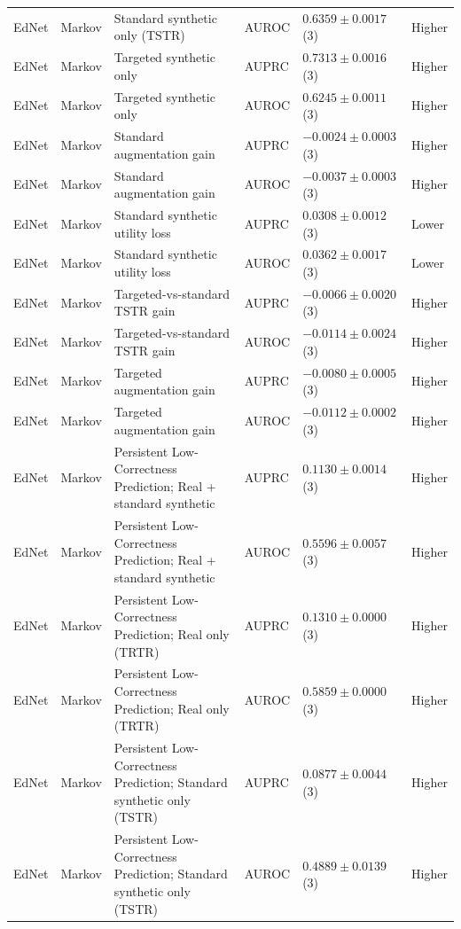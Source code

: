 \begin{longtable}{@{}p{2.25cm}p{2.05cm}p{4.7cm}p{5.0cm}p{2.6cm}p{1.25cm}@{}}
EdNet & Markov & Standard synthetic only (TSTR) & AUROC & $0.6359 \mathbin{\pm} 0.0017$ (3) & Higher \\
EdNet & Markov & Targeted synthetic only & AUPRC & $0.7313 \mathbin{\pm} 0.0016$ (3) & Higher \\
EdNet & Markov & Targeted synthetic only & AUROC & $0.6245 \mathbin{\pm} 0.0011$ (3) & Higher \\
EdNet & Markov & Standard augmentation gain & AUPRC & $-0.0024 \mathbin{\pm} 0.0003$ (3) & Higher \\
EdNet & Markov & Standard augmentation gain & AUROC & $-0.0037 \mathbin{\pm} 0.0003$ (3) & Higher \\
EdNet & Markov & Standard synthetic utility loss & AUPRC & $0.0308 \mathbin{\pm} 0.0012$ (3) & Lower \\
EdNet & Markov & Standard synthetic utility loss & AUROC & $0.0362 \mathbin{\pm} 0.0017$ (3) & Lower \\
EdNet & Markov & Targeted-vs-standard TSTR gain & AUPRC & $-0.0066 \mathbin{\pm} 0.0020$ (3) & Higher \\
EdNet & Markov & Targeted-vs-standard TSTR gain & AUROC & $-0.0114 \mathbin{\pm} 0.0024$ (3) & Higher \\
EdNet & Markov & Targeted augmentation gain & AUPRC & $-0.0080 \mathbin{\pm} 0.0005$ (3) & Higher \\
EdNet & Markov & Targeted augmentation gain & AUROC & $-0.0112 \mathbin{\pm} 0.0002$ (3) & Higher \\
EdNet & Markov & Persistent Low-Correctness Prediction; Real + standard synthetic & AUPRC & $0.1130 \mathbin{\pm} 0.0014$ (3) & Higher \\
EdNet & Markov & Persistent Low-Correctness Prediction; Real + standard synthetic & AUROC & $0.5596 \mathbin{\pm} 0.0057$ (3) & Higher \\
EdNet & Markov & Persistent Low-Correctness Prediction; Real only (TRTR) & AUPRC & $0.1310 \mathbin{\pm} 0.0000$ (3) & Higher \\
EdNet & Markov & Persistent Low-Correctness Prediction; Real only (TRTR) & AUROC & $0.5859 \mathbin{\pm} 0.0000$ (3) & Higher \\
EdNet & Markov & Persistent Low-Correctness Prediction; Standard synthetic only (TSTR) & AUPRC & $0.0877 \mathbin{\pm} 0.0044$ (3) & Higher \\
EdNet & Markov & Persistent Low-Correctness Prediction; Standard synthetic only (TSTR) & AUROC & $0.4889 \mathbin{\pm} 0.0139$ (3) & Higher \\

\end{longtable}
